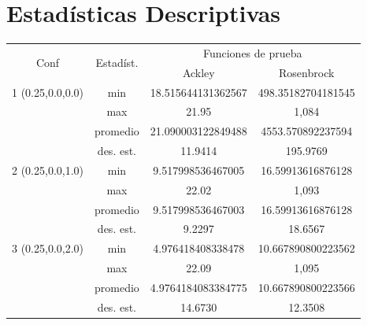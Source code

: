 \documentclass{report}
\begin{document}
    \section{Estadísticas Descriptivas}
    \begin{table}[H]
        \centering
        \begin{tabular}{|c|c|c|c|}
        \hline
        \multirow{2}{*}{Conf} & \multirow{2}{*}{Estadíst.} & \multicolumn{2}{c|}{Funciones de prueba} \\ \cline{3-4} 
                              &                             & Ackley & Rosenbrock \\ \hline
        1 (0.25,0.0,0.0)                    & min                         & 18.515644131362567 & 498.35182704181545 \\ \cline{2-4} 
                              & max                         &     21.95       &    1,084   \\ \cline{2-4} 
                              & promedio                    &      21.090003122849488      &    4553.570892237594    \\ \cline{2-4} 
                              & des. est.                   &   11.9414              &    195.9769        \\ \hline
        2 (0.25,0.0,1.0)                    & min                         &     9.517998536467005   & 16.59913616876128    \\ \cline{2-4}
                              & max                         &  22.02   &    1,093    \\ \cline{2-4}
                              & promedio                    &    9.517998536467003    &  16.59913616876128   \\ \cline{2-4}
                              & des. est.                   &   9.2297            & 18.6567        \\ \hline
        3 (0.25,0.0,2.0)                    & min                         &      4.976418408338478      &     10.667890800223562   \\ \cline{2-4} 
                              & max                         &     22.09       &     1,095   \\ \cline{2-4} 
                              & promedio                    &      4.9764184083384775      &    10.667890800223566    \\ \cline{2-4} 
                              & des. est.                   &   14.6730            &    12.3508        \\ \hline

\end{tabular}
\end{table}
\end{document}
